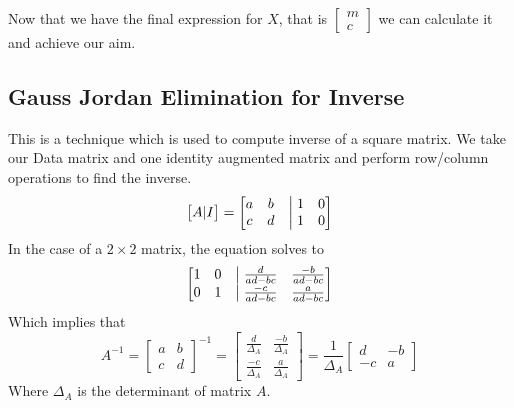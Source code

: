 \documentclass[12pt]{article}
\begin{document}
        Now that we have the final expression for $X$, that is
        $
        \begin{bmatrix}
            m\\
            c
        \end{bmatrix}
        $
        we can calculate it and achieve our aim.
        
    \subsection{Gauss Jordan Elimination for Inverse}
        This is a technique which is used to compute inverse of a square matrix. We take our Data matrix and one identity augmented matrix and perform row/column operations to find the inverse.
        \begin{equation}
            \begin{bmatrix}
                A|I
            \end{bmatrix}
            = 
            \begin{bmatrix}
                a & b & \bigm| 1 & 0\\
                c & d & \bigm| 1 & 0
            \end{bmatrix}
        \end{equation}
        In the case of a $2 \times 2$ matrix, the equation solves to
        \begin{equation*}
            \begin{bmatrix}
                1 & 0 & \bigm| \frac{d}{ad-bc} & \frac{-b}{ad-bc}\\
                0 & 1 & \bigm| \frac{-c}{ad-bc} & \frac{a}{ad-bc}
            \end{bmatrix}
        \end{equation*}
        Which implies that 
        \begin{equation}
            A^{-1} =
            \begin{bmatrix}
                a & b\\
                c & d
            \end{bmatrix}^{-1} = 
            \begin{bmatrix}
                \frac{d}{\Delta_A} & \frac{-b}{\Delta_A}\\
                \frac{-c}{\Delta_A} & \frac{a}{\Delta_A}
            \end{bmatrix} = \frac{1}{\Delta_A}
            \begin{bmatrix}
                d & -b\\
                -c & a
            \end{bmatrix}
        \end{equation}
        Where $\Delta_A$ is the determinant of matrix $A$.
        
\end{document}

